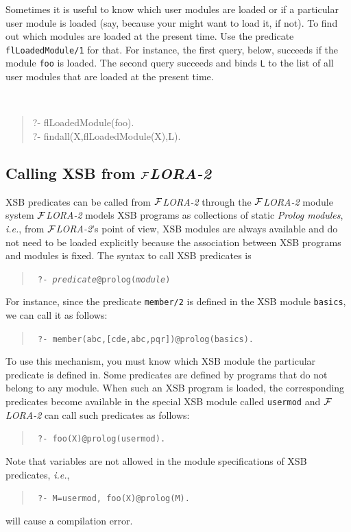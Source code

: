 \documentclass[11pt]{article}
\newcommand{\FLORA}{{\mbox{${\cal F}${\small\it LORA}\rm\emph{-2}}}\xspace}
\begin{document}
Sometimes it is useful to know which user modules are loaded or if a
particular user module is loaded (say, because your might want to load it,
if not).  To find out which modules are loaded at the present time. Use the
predicate {\tt flLoadedModule/1} for that. For instance, the first query,
below, succeeds if the module {\tt foo} is loaded. The second query
succeeds and binds {\tt L} to the list of all user modules that are loaded
at the present time.
{\tt
\begin{quote}
  ?- flLoadedModule(foo).\\
  ?- findall(X,flLoadedModule(X),L).
\end{quote}
}


\subsection{Calling XSB from \FLORA}\label{sec-prolog-modules}

XSB predicates can be called from \FLORA through the \FLORA module system
\FLORA models XSB programs as collections of static {\em Prolog modules},
{\it i.e.}, from \FLORA's point of view, XSB modules are always available
and do not need to be loaded explicitly because the association between XSB
programs and modules is fixed.  The syntax to call XSB predicates is
\begin{quote}
  \tt
  ?- {\it predicate}@prolog({\it module})  
\end{quote}
For instance, since the predicate {\tt member/2} is defined in the XSB
module {\tt basics}, we can call it as follows:
\begin{quote}
 \tt
 ?- member(abc,[cde,abc,pqr])@prolog(basics).
\end{quote}
To use this mechanism, you must know which XSB module the particular predicate
is defined in. Some predicates are defined by programs that do not belong
to any module. When such an XSB program is loaded, the corresponding
predicates become available in the special XSB module called {\tt usermod} and
\FLORA can call such predicates as follows:
\begin{quote}
 \tt
 ?- foo(X)@prolog(usermod).
\end{quote}
Note that variables are not allowed in the module specifications of XSB
predicates, {\it i.e.},
\begin{quote}
 \tt
 ?- M=usermod, foo(X)@prolog(M).
\end{quote}
will cause a compilation error.
\end{document}
